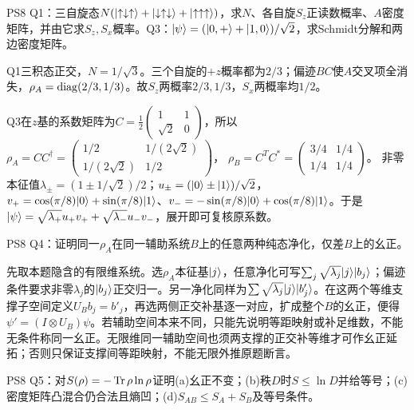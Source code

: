 \begin{exercise}
PS8 Q1：三自旋态$N(\lvert \uparrow\downarrow\uparrow\rangle+\lvert \downarrow\uparrow\downarrow\rangle+\lvert \uparrow\uparrow\uparrow\rangle)$，求$N$、各自旋$S_z$正读数概率、$A$密度矩阵，并由它求$S_z,S_x$概率。Q3：$\lvert \psi\rangle=(\lvert 0,+\rangle+\lvert 1,0\rangle)/\sqrt2$，求Schmidt分解和两边密度矩阵。
\end{exercise}
\begin{solution}
Q1三积态正交，$N=1/\sqrt3$。三个自旋的$+z$概率都为$2/3$；偏迹$BC$使$A$交叉项全消失，$\rho_A=\operatorname{diag}(2/3,1/3)$。故$S_z$两概率$2/3,1/3$，$S_x$两概率均$1/2$。

Q3在$z$基的系数矩阵为$C=\frac12\begin{pmatrix}1&1\\\sqrt2&0\end{pmatrix}$，所以
$\rho_A=CC^\dagger=\begin{pmatrix}1/2&1/(2\sqrt2)\\1/(2\sqrt2)&1/2\end{pmatrix}$，
$\rho_B=C^TC^*=\begin{pmatrix}3/4&1/4\\1/4&1/4\end{pmatrix}$。
非零本征值$\lambda_\pm=(1\pm1/\sqrt2)/2$；$u_\pm=(\lvert 0\rangle\pm\lvert 1\rangle)/\sqrt2$，$v_+=\cos(\pi/8)\lvert 0\rangle+\sin(\pi/8)\lvert 1\rangle$、$v_-=-\sin(\pi/8)\lvert 0\rangle+\cos(\pi/8)\lvert 1\rangle$。于是$\lvert \psi\rangle=\sqrt{\lambda_+}u_+v_++\sqrt{\lambda_-}u_-v_-$，展开即可复核原系数。
\end{solution}
\begin{exercise}
PS8 Q4：证明同一$\rho_A$在同一辅助系统$B$上的任意两种纯态净化，仅差$B$上的幺正。
\end{exercise}
\begin{solution}
先取本题隐含的有限维系统。选$\rho_A$本征基$\lvert j\rangle$，任意净化可写$\sum_j\sqrt{\lambda_j}\lvert j\rangle\lvert b_j\rangle$；偏迹条件要求非零$\lambda_j$的$\lvert b_j\rangle$正交归一。另一净化同样为$\sum\sqrt{\lambda_j}\lvert j\rangle\lvert b'_j\rangle$。在这两个等维支撑子空间定义$U_Bb_j=b'_j$，再选两侧正交补基逐一对应，扩成整个$B$的幺正，便得$\psi'=(I\otimes U_B)\psi$。若辅助空间本来不同，只能先说明等距映射或补足维数，不能无条件称同一幺正。无限维同一辅助空间也须两支撑的正交补等维才可作幺正延拓；否则只保证支撑间等距映射，不能无限外推原题断言。
\end{solution}
\begin{exercise}
PS8 Q5：对$S(\rho)=-\operatorname{Tr}\rho\ln\rho$证明(a)幺正不变；(b)秩$D$时$S\le\ln D$并给等号；(c)密度矩阵凸混合仍合法且熵凹；(d)$S_{AB}\le S_A+S_B$及等号条件。
\end{exercise}
